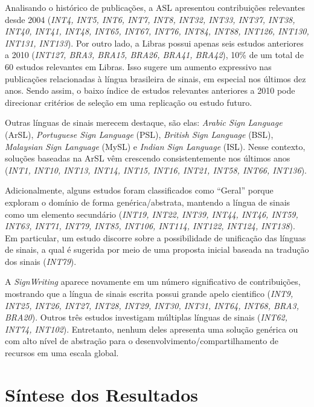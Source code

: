Analisando o histórico de publicações, a ASL apresentou contribuições relevantes desde 2004 (\textit{INT4, INT5, INT6, INT7, INT8, INT32, INT33, INT37, INT38, INT40, INT41, INT48, INT65, INT67, INT76, INT84, INT88, INT126, INT130, INT131, INT133}). Por outro lado, a Libras possui apenas seis estudos anteriores a 2010 (\textit{INT127, BRA3, BRA15, BRA26, BRA41, BRA42}), 10\% de um total de 60 estudos relevantes em Libras. Isso sugere um aumento expressivo nas publicações relacionadas à língua brasileira de sinais, em especial nos últimos dez anos. Sendo assim, o baixo índice de estudos relevantes anteriores a 2010 pode direcionar critérios de seleção em uma replicação ou estudo futuro.

Outras línguas de sinais merecem destaque, são elas: \textit{Arabic Sign Language} (ArSL), \textit{Portuguese Sign Language} (PSL), \textit{British Sign Language} (BSL), \textit{Malaysian Sign Language} (MySL) e \textit{Indian Sign Language} (ISL). Nesse contexto, soluções baseadas na ArSL vêm crescendo consistentemente nos últimos anos (\textit{INT1, INT10, INT13, INT14, INT15, INT16, INT21, INT58, INT66, INT136}).

Adicionalmente, alguns estudos foram classificados como ``Geral'' porque exploram o domínio de forma genérica/abstrata, mantendo a língua de sinais como um elemento secundário (\textit{INT19, INT22, INT39, INT44, INT46, INT59, INT63, INT71, INT79, INT85, INT106, INT114, INT122, INT124, INT138}). Em particular, um estudo discorre sobre a possibilidade de unificação das línguas de sinais, a qual é sugerida por meio de uma proposta inicial baseada na tradução dos sinais (\textit{INT79}).

A \textit{SignWriting} aparece novamente em um número significativo de contribuições, mostrando que a língua de sinais escrita possui grande apelo cientifico (\textit{INT9, INT25, INT26, INT27, INT28, INT29, INT30, INT31, INT64, INT68, BRA3, BRA20}). Outros três estudos investigam múltiplas línguas de sinais (\textit{INT62, INT74, INT102}). Entretanto, nenhum deles apresenta uma solução genérica ou com alto nível de abstração para o desenvolvimento/compartilhamento de recursos em uma escala global.

\section{Síntese dos Resultados}
\label{ms:sintese-resultados}


